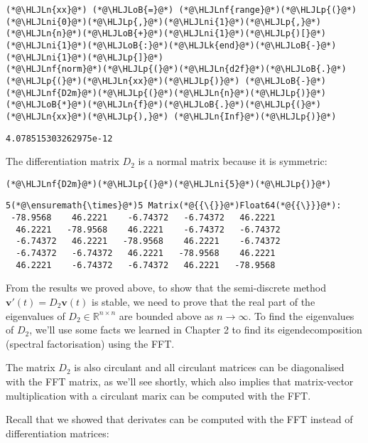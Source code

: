 \documentclass[12pt,landscape]{article}
\newcommand{\HLJLk}[1]{\textcolor[RGB]{148,91,176}{\textbf{#1}}}
\newcommand{\HLJLn}[1]{#1}
\newcommand{\HLJLnf}[1]{\textcolor[RGB]{66,102,213}{#1}}
\newcommand{\HLJLni}[1]{\textcolor[RGB]{59,151,46}{#1}}
\newcommand{\HLJLoB}[1]{\textcolor[RGB]{102,102,102}{\textbf{#1}}}
\newcommand{\HLJLp}[1]{#1}
\begin{document}
{\begin{lstlisting}
(*@\HLJLn{xx}@*) (*@\HLJLoB{=}@*) (*@\HLJLnf{range}@*)(*@\HLJLp{(}@*)(*@\HLJLni{0}@*)(*@\HLJLp{,}@*)(*@\HLJLni{1}@*)(*@\HLJLp{,}@*)(*@\HLJLn{n}@*)(*@\HLJLoB{+}@*)(*@\HLJLni{1}@*)(*@\HLJLp{)[}@*)(*@\HLJLni{1}@*)(*@\HLJLoB{:}@*)(*@\HLJLk{end}@*)(*@\HLJLoB{-}@*)(*@\HLJLni{1}@*)(*@\HLJLp{]}@*)
(*@\HLJLnf{norm}@*)(*@\HLJLp{(}@*)(*@\HLJLn{d2f}@*)(*@\HLJLoB{.}@*)(*@\HLJLp{(}@*)(*@\HLJLn{xx}@*)(*@\HLJLp{)}@*) (*@\HLJLoB{-}@*) (*@\HLJLnf{D2m}@*)(*@\HLJLp{(}@*)(*@\HLJLn{n}@*)(*@\HLJLp{)}@*)(*@\HLJLoB{*}@*)(*@\HLJLn{f}@*)(*@\HLJLoB{.}@*)(*@\HLJLp{(}@*)(*@\HLJLn{xx}@*)(*@\HLJLp{),}@*) (*@\HLJLn{Inf}@*)(*@\HLJLp{)}@*)
\end{lstlisting}

\begin{lstlisting}
4.078515303262975e-12
\end{lstlisting}


The differentiation matrix $D_2$ is a normal matrix because it is symmetric:


\begin{lstlisting}
(*@\HLJLnf{D2m}@*)(*@\HLJLp{(}@*)(*@\HLJLni{5}@*)(*@\HLJLp{)}@*)
\end{lstlisting}

\begin{lstlisting}
5(*@\ensuremath{\times}@*)5 Matrix(*@{{\{}}@*)Float64(*@{{\}}}@*):
 -78.9568    46.2221    -6.74372   -6.74372   46.2221
  46.2221   -78.9568    46.2221    -6.74372   -6.74372
  -6.74372   46.2221   -78.9568    46.2221    -6.74372
  -6.74372   -6.74372   46.2221   -78.9568    46.2221
  46.2221    -6.74372   -6.74372   46.2221   -78.9568
\end{lstlisting}


From the results we proved above, to show that the semi-discrete method $\mathbf{v}'(t) = D_2 \mathbf{v}(t)$ is stable, we need to prove that the real part of the eigenvalues of $D_2 \in \mathbb{R}^{n \times n}$ are bounded above as $n \to \infty$.  To find the eigenvalues of $D_2$, we'll use some facts we learned in Chapter 2 to find its eigendecomposition (spectral factorisation) using the FFT.

The matrix $D_2$ is also circulant and all circulant matrices can be diagonalised with the FFT matrix, as we'll see shortly, which also implies that matrix-vector multiplication with a circulant marix can be computed with the FFT.

Recall that we showed that derivates can be computed with the FFT instead of differentiation matrices:


}
\end{document}
